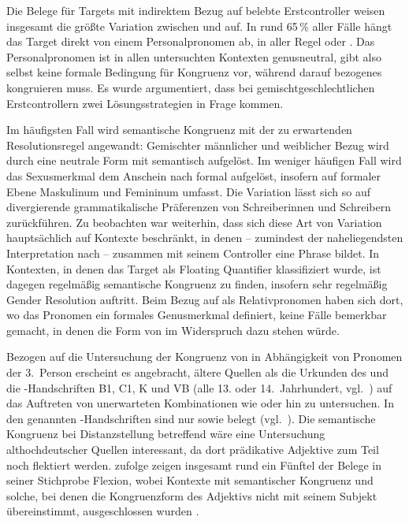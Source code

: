 Die Belege für Targets mit indirektem Bezug auf belebte Erstcontroller weisen
insgesamt die größte Variation zwischen  und  auf. In
rund 65\,\% aller Fälle hängt das Target direkt von einem Personalpronomen ab,
in aller Regel  oder . Das Personalpronomen ist in allen
untersuchten Kontexten genusneutral, gibt also selbst keine formale Bedingung
für Kongruenz vor, während darauf bezogenes  kongruieren muss. Es
wurde argumentiert, dass bei gemischtgeschlechtlichen Erstcontrollern zwei
Lösungsstrategien in Frage kommen.

Im häufigsten Fall wird semantische Kongruenz mit der zu erwartenden
Resolutionsregel angewandt: Gemischter männlicher und weiblicher Bezug wird
durch eine neutrale Form mit \mbox{} semantisch aufgelöst. Im weniger
häufigen Fall wird das Sexusmerkmal dem Anschein nach formal aufgelöst,
insofern  auf formaler Ebene Maskulinum und Femininum umfasst. Die
Variation lässt sich so auf divergierende grammatikalische Präferenzen von
Schreiberinnen und Schreibern zurück\-führen. Zu beobachten war weiterhin, dass
sich diese Art von Variation hauptsächlich auf Kontexte beschränkt, in denen
 -- zumindest der naheliegendsten Interpretation nach -- zusammen
mit seinem Controller eine Phrase bildet. In Kontexten, in denen das Target als
Floating Quantifier klassifiziert wurde, ist dagegen regelmäßig semantische
Kongruenz zu finden, insofern sehr regelmäßig Gender Resolution auftritt. Beim
Bezug auf  als Relativpronomen haben sich dort, wo das Pronomen
ein formales Genusmerkmal definiert, keine Fälle bemerkbar gemacht, in denen
die Form von  im Widerspruch dazu stehen würde.

Bezogen auf die Untersuchung der Kongruenz von  in Abhängigkeit von
Pro\-nomen der 3.~Person erscheint es angebracht, ältere Quellen als die
Urkunden des \CAO{} und die \KC{}-Handschriften B1, C1, K und VB (alle 13. oder
14.~Jahrhundert, vgl.~) auf das Auftreten von unerwarteten
Kombinationen wie  oder  hin zu untersuchen.
In den genannten \KC{}-Handschriften sind nur  sowie
 belegt (vgl.~). Die
semantische Kongruenz bei Distanz\-stellung betreffend wäre eine Untersuchung
althochdeutscher Quellen interessant, da dort prädikative Adjektive zum Teil
noch flektiert werden. \citet[310--311]{fleischer2007} zufolge zeigen insgesamt
rund ein Fünftel der Belege in seiner Stichprobe Flexion, wobei Kontexte mit
semantischer Kongruenz und solche, bei denen die Kongruenzform des Adjektivs
nicht mit seinem Subjekt übereinstimmt, ausgeschlossen wurden
\autocite[304]{fleischer2007}.

